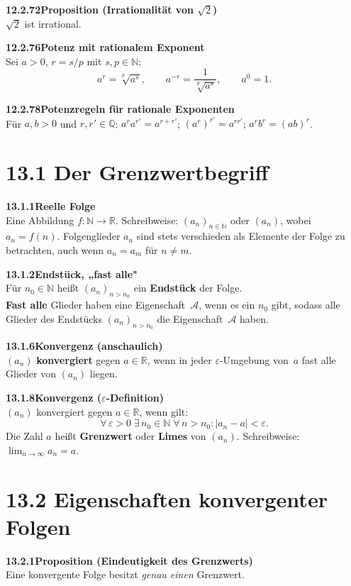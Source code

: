\documentclass[a4paper,12pt]{article}
\newcommand{\gentry}[3]{%
  \noindent\textbf{#1\quad #2}\nopagebreak\\[0.2em]
  #3\par\smallskip
}
\begin{document}
\gentry{12.2.72}{Proposition (Irrationalität von $\sqrt{2}$)}{%
  $\sqrt{2}$ ist irrational.
}

\gentry{12.2.76}{Potenz mit rationalem Exponent}{%
  Sei $a > 0$, $r = s/p$ mit $s,p \in \mathbb{N}$:
  \[
    a^r = \sqrt[p]{a^s}, \qquad a^{-r} = \frac{1}{\sqrt[p]{a^s}}, \qquad a^0 = 1.
  \]
}

\gentry{12.2.78}{Potenzregeln für rationale Exponenten}{%
  Für $a,b > 0$ und $r,r' \in \mathbb{Q}$:
  $a^r a^{r'} = a^{r+r'}$; \quad $(a^r)^{r'} = a^{rr'}$; \quad $a^r b^r = (ab)^r$.
}

\section*{13.1 \quad Der Grenzwertbegriff}

\gentry{13.1.1}{Reelle Folge}{%
  Eine Abbildung $f:\mathbb{N} \to \mathbb{R}$. Schreibweise: $(a_n)_{n \in \mathbb{N}}$ oder $(a_n)$,
  wobei $a_n = f(n)$. Folgenglieder $a_n$ sind stets verschieden als Elemente der Folge
  zu betrachten, auch wenn $a_n = a_m$ für $n \neq m$.
}

\gentry{13.1.2}{Endstück, „fast alle"}{%
  Für $n_0 \in \mathbb{N}$ heißt $(a_n)_{n > n_0}$ ein \textbf{Endstück} der Folge.\\
  \textbf{Fast alle} Glieder haben eine Eigenschaft~$\mathcal{A}$, wenn es ein $n_0$ gibt,
  sodass alle Glieder des Endstücks $(a_n)_{n > n_0}$ die Eigenschaft~$\mathcal{A}$ haben.
}

\gentry{13.1.6}{Konvergenz (anschaulich)}{%
  $(a_n)$ \textbf{konvergiert} gegen $a \in \mathbb{R}$, wenn in jeder $\varepsilon$-Umgebung
  von~$a$ fast alle Glieder von $(a_n)$ liegen.
}

\gentry{13.1.8}{Konvergenz ($\varepsilon$-Definition)}{%
  $(a_n)$ konvergiert gegen $a \in \mathbb{R}$, wenn gilt:
  \[
    \forall\,\varepsilon > 0\;\exists\,n_0 \in \mathbb{N}\;\forall\,n > n_0 : |a_n - a| < \varepsilon.
  \]
  Die Zahl $a$ heißt \textbf{Grenzwert} oder \textbf{Limes} von $(a_n)$.
  Schreibweise: $\lim_{n\to\infty} a_n = a$.
}

\section*{13.2 \quad Eigenschaften konvergenter Folgen}

\gentry{13.2.1}{Proposition (Eindeutigkeit des Grenzwerts)}{%
  Eine konvergente Folge besitzt \emph{genau einen} Grenzwert.
}
\end{document}
